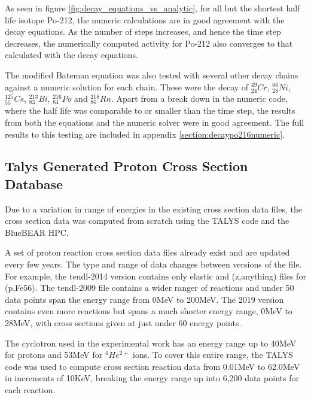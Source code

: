 As seen in figure \ref{fig:decay_equations_vs_analytic}, for all but the shortest half life isotope Po-212, the numeric calculations are in good agreement with the decay equations.  As the number of steps increases, and hence the time step decreases, the numerically computed activity for Po-212 also converges to that calculated with the decay equations.

The modified Bateman equation was also tested with several other decay chains against a numeric solution for each chain.  These were the decay of ${}^{49}_{24}Cr$, ${}^{66}_{28}Ni$, ${}^{125}_{55}Cs$, ${}^{213}_{83}Bi$, ${}^{216}_{84}Po$ and ${}^{218}_{86}Rn$.  Apart from a break down in the numeric code, where the half life was comparable to or smaller than the time step, the results from both the equations and the numeric solver were in good agreement.  The full results to this testing are included in appendix \ref{section:decaypo216numeric}.




\subsection{Talys Generated Proton Cross Section Database}
\label{section:activitytalysdb}

Due to a variation in range of energies in the existing cross section data files, the cross section data was computed from scratch using the TALYS code and the BlueBEAR HPC.

A set of proton reaction cross section data files already exist and are updated every few years.  The type and range of data changes between versions of the file.  For example, the \acrshort{tendl}-2014 version contains only elastic and (z,anything) files for (p,Fe56).  The \acrshort{tendl}-2009 file contains a wider ranger of reactions and under 50 data points span the energy range from 0MeV to 200MeV.  The 2019 version contains even more reactions but spans a much shorter energy range, 0MeV to 28MeV, with cross sections given at just under 60 energy points.

The cyclotron used in the experimental work has an energy range up to 40MeV for protons and 53MeV for ${}^{4}He^{2+}$ ions.  To cover this entire range, the TALYS code was used to compute cross section reaction data from 0.01MeV to 62.0MeV in increments of 10KeV, breaking the energy range up into 6,200 data points for each reaction.

